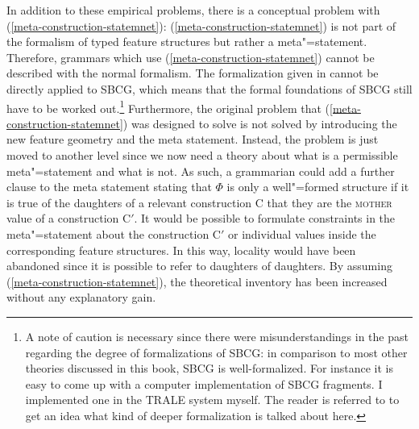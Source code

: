 In addition to these empirical problems, there is a conceptual problem with (\ref{meta-construction-statemnet}):
(\ref{meta-construction-statemnet}) is not part of the formalism of typed feature structures but
rather a meta"=statement.
Therefore,\label{page-sbcg-formalization} grammars which use (\ref{meta-construction-statemnet}) cannot be described with the normal formalism. The formalization given in
\citet{Richter2004a-u} cannot be directly applied to SBCG, which means that the formal foundations
of SBCG still have to be worked out.\footnote{%
  A note of caution is necessary since there were misunderstandings in the past regarding the degree
  of formalizations of SBCG: in comparison to most other theories discussed in this book,
  SBCG is well-formalized. For instance it is easy to come up with a computer implementation of SBCG
  fragments. I implemented one in the TRALE system myself. The reader is referred to \citet{Richter2004a-u} to get an idea what kind
  of deeper formalization is talked about here.
}
Furthermore, the original problem that (\ref{meta-construction-statemnet}) was designed to solve is
not solved by introducing the new feature geometry and the meta statement. Instead, the problem
is just moved to another level since we now need a theory about what is a permissible meta"=statement and what is not. As such, a grammarian
could add a further clause to the meta statement stating that $\Phi$ is only a well"=formed structure if it is true of the daughters of a relevant construction C
that they are the \textsc{mother} value of a construction C$'$. It would be possible to formulate constraints in the meta"=statement about the construction C$'$ or individual
values inside the corresponding feature structures.
In this way, locality would have been abandoned since it is possible to refer to daughters of daughters.
By assuming (\ref{meta-construction-statemnet}), the theoretical inventory has been increased without any explanatory gain.

